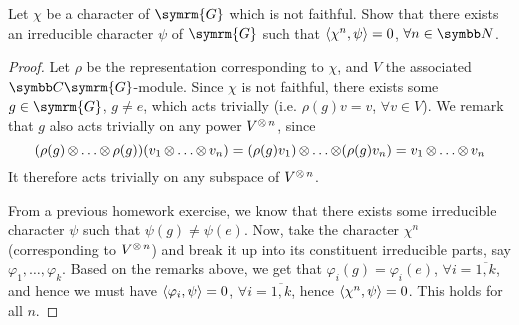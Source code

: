 \begin{exercise}
Let \(\chi\) be a character of \(\symrm{G}\) which is not faithful. Show that there exists an irreducible character \(\psi\) of \(\symrm{G}\) such that \(\left\langle\chi^n, \psi\right\rangle = 0\), \(\forall n \in \naturals\).
\end{exercise}
\begin{proof}
Let \(\rho\) be the representation corresponding to \(\chi\), and \(V\) the associated \(\complex \symrm{G}\)-module. Since \(\chi\) is not faithful, there exists some \(g \in \symrm{G}\), \(g \neq e\), which acts trivially (i.e. \(\rho(g) v = v\), \(\forall v \in V\)). We remark that \(g\) also acts trivially on any power \(V^{\operatorname{\otimes} n}\), since \[
    (\rho(g) \operatorname{\otimes} \dots \operatorname{\otimes} \rho(g)) (v_1 \operatorname{\otimes} \dots \operatorname{\otimes} v_n) = (\rho(g) v_1) \operatorname{\otimes} \dots \operatorname{\otimes} (\rho(g) v_n) = v_1 \operatorname{\otimes} \dots \operatorname{\otimes} v_n
\]
It therefore acts trivially on any subspace of \(V^{\operatorname{\otimes} n}\).

From a previous homework exercise, we know that there exists some irreducible character \(\psi\) such that \(\psi(g) \neq \psi(e)\). Now, take the character \(\chi^n\) (corresponding to \(V^{\operatorname{\otimes} n}\)) and break it up into its constituent irreducible parts, say \(\varphi_1, \dots, \varphi_k\). Based on the remarks above, we get that \(\varphi_i(g) = \varphi_i (e)\), \(\forall i = \overline{1, k}\), and hence we must have \(\left\langle\varphi_i, \psi\right\rangle = 0\), \(\forall i = \overline{1, k}\), hence \(\left\langle\chi^n, \psi\right\rangle = 0\). This holds for all \(n\).
\end{proof}